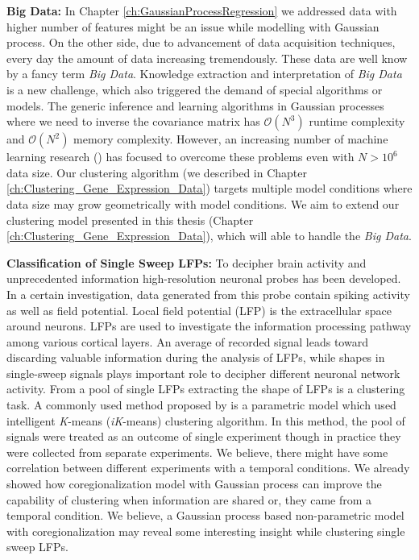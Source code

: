 \textbf{Big Data:} 
In Chapter \ref{ch:GaussianProcessRegression} we addressed data with higher number of features might be an issue while modelling with Gaussian process. On the other side, due to advancement of data acquisition techniques, every day the amount of data increasing tremendously. These data are well know by a fancy term \emph{Big Data}. Knowledge extraction and interpretation of \emph{Big Data} is a new challenge, which also triggered the demand of special algorithms or models. The generic inference and learning algorithms in Gaussian processes where we need to inverse the covariance matrix has $\mathcal{O}\left(N^3\right)$ runtime complexity and $\mathcal{O}\left(N^2\right)$ memory complexity. However, an increasing number of machine learning research (\cite{Hensman:2013a, Dai:2014}) has focused to overcome these problems even with $N>10^6$ data size. Our clustering algorithm (we described in Chapter \ref{ch:Clustering_Gene_Expression_Data}) targets multiple model conditions where data size may grow geometrically with model conditions. We aim to extend our clustering model presented in this thesis (Chapter \ref{ch:Clustering_Gene_Expression_Data}), which will able to handle the \emph{Big Data}.  

\textbf{Classification of Single Sweep LFPs:} To decipher brain activity and unprecedented information high-resolution neuronal probes has been developed. In a certain investigation, data generated from this probe contain spiking activity as well as field potential. Local field potential (LFP) is the extracellular space around neurons. LFPs are used to investigate the information processing pathway among various cortical layers. An average of recorded signal leads toward discarding valuable information during the analysis of LFPs, while shapes in single-sweep signals plays important role to decipher different neuronal network activity. From a pool of single LFPs extracting the shape of LFPs is a clustering task. A commonly used method proposed by \cite{Mahmud:2010} is a parametric model which used intelligent \emph{K}-means (\emph{iK}-means) clustering algorithm. In this method, the pool of signals were treated as an outcome of single experiment though in practice they were collected from separate experiments. We believe, there might have some correlation between different experiments with a temporal conditions. We already showed how coregionalization model with Gaussian process can improve the capability of clustering when information are shared or, they came from a temporal condition. We believe, a Gaussian process based non-parametric model with coregionalization may reveal some interesting insight while clustering single sweep LFPs.

